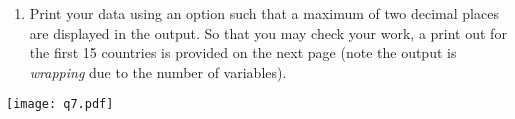 \begin{enumerate}
\begin{enumerate}
\item Print your data using an option such that a maximum of two decimal places are displayed in the output.  So that you may check your work, a print out for the first 15 countries is provided on the next page (note the output is \emph{wrapping} due to the number of variables).
\end{enumerate}
%
\end{enumerate}
\hspace*{-0.3in}\texttt{[image: q7.pdf]}
 
